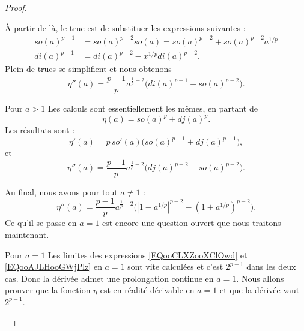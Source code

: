 \begin{proof}
\begin{subproof}
        À partir de là, le truc est de substituer les expressions suivantes :
        \begin{subequations}
            \begin{align}
                so(a)^{p-1}&=so(a)^{p-2}so(a)=so(a)^{p-2}+so(a)^{p-2}a^{1/p}\\
                di(a)^{p-1}&=di(a)^{p-2}-x^{1/p}di(a)^{p-2}. 
            \end{align}
        \end{subequations}
        Plein de trucs se simplifient et nous obtenons
        \begin{equation}
            \eta''(a)=\frac{ p-1 }{ p }a^{\frac{1}{ p }-2}\big( di(a)^{p-1}-so(a)^{p-2} \big).
        \end{equation}
    \item[Pour \( a>1\)]
            Les calculs sont essentiellement les mêmes, en partant de
            \begin{equation}
                \eta(a)=so(a)^p+dj(a)^p.
            \end{equation}
            Les résultats sont :
            \begin{equation}    \label{EQooAJLHooGWjPlz}
                \eta'(a)=p\,so'(a)\big( so(a)^{p-1}+dj(a)^{p-1} \big),
            \end{equation}
            et
            \begin{equation}
                \eta''(a)=\frac{ p-1 }{ p }a^{\frac{1}{ p }-2}\big( dj(a)^{p-2}-so(a)^{p-2} \big).
            \end{equation}
    \end{subproof}
    Au final, nous avons pour tout \( a\neq 1\) :
    \begin{equation}
        \eta''(a)=\frac{ p-1 }{ p }a^{\frac{1}{ p }-2}\big( | 1-a^{1/p} |^{p-2}-(1+a^{1/p})^{p-2} \big).
    \end{equation}
    Ce qu'il se passe en \( a=1\) est encore une question ouvert que nous traitons maintenant.
    \begin{subproof}
        \item[Pour \( a=1\)]
            Les limites des expressions \eqref{EQooCLXZooXClOwd} et \eqref{EQooAJLHooGWjPlz} en \( a=1\) sont vite calculées et c'est \( 2^{p-1}\) dans les deux cas. Donc la dérivée admet une prolongation continue en \( a=1\). Nous allons prouver que la fonction \( \eta\) est en réalité dérivable en \( a=1\) et que la dérivée vaut \( 2^{p-1}\).


\end{subproof}
\end{proof}
